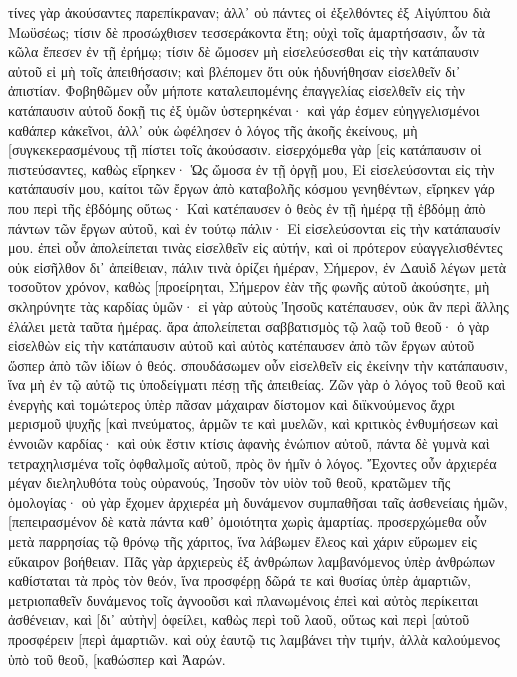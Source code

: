 τίνες γὰρ ἀκούσαντες παρεπίκραναν; ἀλλ᾽ οὐ πάντες οἱ ἐξελθόντες ἐξ Αἰγύπτου διὰ Μωϋσέως; 
τίσιν δὲ προσώχθισεν τεσσεράκοντα ἔτη; οὐχὶ τοῖς ἁμαρτήσασιν, ὧν τὰ κῶλα ἔπεσεν ἐν τῇ ἐρήμῳ; 
τίσιν δὲ ὤμοσεν μὴ εἰσελεύσεσθαι εἰς τὴν κατάπαυσιν αὐτοῦ εἰ μὴ τοῖς ἀπειθήσασιν; 
καὶ βλέπομεν ὅτι οὐκ ἠδυνήθησαν εἰσελθεῖν δι᾽ ἀπιστίαν. 
Φοβηθῶμεν οὖν μήποτε καταλειπομένης ἐπαγγελίας εἰσελθεῖν εἰς τὴν κατάπαυσιν αὐτοῦ δοκῇ τις ἐξ ὑμῶν ὑστερηκέναι· 
καὶ γάρ ἐσμεν εὐηγγελισμένοι καθάπερ κἀκεῖνοι, ἀλλ᾽ οὐκ ὠφέλησεν ὁ λόγος τῆς ἀκοῆς ἐκείνους, μὴ [συγκεκερασμένους τῇ πίστει τοῖς ἀκούσασιν. 
εἰσερχόμεθα γὰρ [εἰς κατάπαυσιν οἱ πιστεύσαντες, καθὼς εἴρηκεν· Ὡς ὤμοσα ἐν τῇ ὀργῇ μου, Εἰ εἰσελεύσονται εἰς τὴν κατάπαυσίν μου, καίτοι τῶν ἔργων ἀπὸ καταβολῆς κόσμου γενηθέντων, 
εἴρηκεν γάρ που περὶ τῆς ἑβδόμης οὕτως· Καὶ κατέπαυσεν ὁ θεὸς ἐν τῇ ἡμέρᾳ τῇ ἑβδόμῃ ἀπὸ πάντων τῶν ἔργων αὐτοῦ, 
καὶ ἐν τούτῳ πάλιν· Εἰ εἰσελεύσονται εἰς τὴν κατάπαυσίν μου. 
ἐπεὶ οὖν ἀπολείπεται τινὰς εἰσελθεῖν εἰς αὐτήν, καὶ οἱ πρότερον εὐαγγελισθέντες οὐκ εἰσῆλθον δι᾽ ἀπείθειαν, 
πάλιν τινὰ ὁρίζει ἡμέραν, Σήμερον, ἐν Δαυὶδ λέγων μετὰ τοσοῦτον χρόνον, καθὼς [προείρηται, Σήμερον ἐὰν τῆς φωνῆς αὐτοῦ ἀκούσητε, μὴ σκληρύνητε τὰς καρδίας ὑμῶν· 
εἰ γὰρ αὐτοὺς Ἰησοῦς κατέπαυσεν, οὐκ ἂν περὶ ἄλλης ἐλάλει μετὰ ταῦτα ἡμέρας. 
ἄρα ἀπολείπεται σαββατισμὸς τῷ λαῷ τοῦ θεοῦ· 
ὁ γὰρ εἰσελθὼν εἰς τὴν κατάπαυσιν αὐτοῦ καὶ αὐτὸς κατέπαυσεν ἀπὸ τῶν ἔργων αὐτοῦ ὥσπερ ἀπὸ τῶν ἰδίων ὁ θεός. 
σπουδάσωμεν οὖν εἰσελθεῖν εἰς ἐκείνην τὴν κατάπαυσιν, ἵνα μὴ ἐν τῷ αὐτῷ τις ὑποδείγματι πέσῃ τῆς ἀπειθείας. 
Ζῶν γὰρ ὁ λόγος τοῦ θεοῦ καὶ ἐνεργὴς καὶ τομώτερος ὑπὲρ πᾶσαν μάχαιραν δίστομον καὶ διϊκνούμενος ἄχρι μερισμοῦ ψυχῆς [καὶ πνεύματος, ἁρμῶν τε καὶ μυελῶν, καὶ κριτικὸς ἐνθυμήσεων καὶ ἐννοιῶν καρδίας· 
καὶ οὐκ ἔστιν κτίσις ἀφανὴς ἐνώπιον αὐτοῦ, πάντα δὲ γυμνὰ καὶ τετραχηλισμένα τοῖς ὀφθαλμοῖς αὐτοῦ, πρὸς ὃν ἡμῖν ὁ λόγος. 
Ἔχοντες οὖν ἀρχιερέα μέγαν διεληλυθότα τοὺς οὐρανούς, Ἰησοῦν τὸν υἱὸν τοῦ θεοῦ, κρατῶμεν τῆς ὁμολογίας· 
οὐ γὰρ ἔχομεν ἀρχιερέα μὴ δυνάμενον συμπαθῆσαι ταῖς ἀσθενείαις ἡμῶν, [πεπειρασμένον δὲ κατὰ πάντα καθ᾽ ὁμοιότητα χωρὶς ἁμαρτίας. 
προσερχώμεθα οὖν μετὰ παρρησίας τῷ θρόνῳ τῆς χάριτος, ἵνα λάβωμεν ἔλεος καὶ χάριν εὕρωμεν εἰς εὔκαιρον βοήθειαν. 
Πᾶς γὰρ ἀρχιερεὺς ἐξ ἀνθρώπων λαμβανόμενος ὑπὲρ ἀνθρώπων καθίσταται τὰ πρὸς τὸν θεόν, ἵνα προσφέρῃ δῶρά τε καὶ θυσίας ὑπὲρ ἁμαρτιῶν, 
μετριοπαθεῖν δυνάμενος τοῖς ἀγνοοῦσι καὶ πλανωμένοις ἐπεὶ καὶ αὐτὸς περίκειται ἀσθένειαν, 
καὶ [δι᾽ αὐτὴν] ὀφείλει, καθὼς περὶ τοῦ λαοῦ, οὕτως καὶ περὶ [αὑτοῦ προσφέρειν [περὶ ἁμαρτιῶν. 
καὶ οὐχ ἑαυτῷ τις λαμβάνει τὴν τιμήν, ἀλλὰ καλούμενος ὑπὸ τοῦ θεοῦ, [καθώσπερ καὶ Ἀαρών. 
